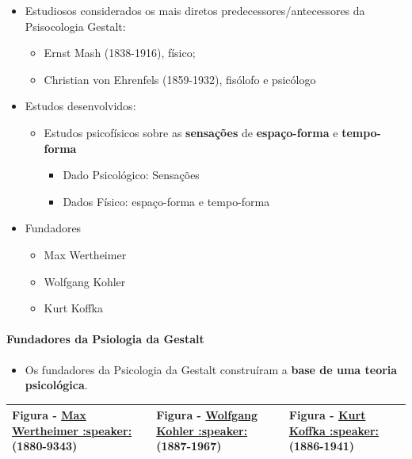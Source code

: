 \documentclass[
]{book}
\providecommand{\tightlist}{%
  \setlength{\itemsep}{0pt}\setlength{\parskip}{0pt}}
\begin{document}
\begin{itemize}
\tightlist
\item
  Estudiosos considerados os mais diretos predecessores/antecessores da Psisocologia Gestalt:

  \begin{itemize}
  \tightlist
  \item
    Ernst Mash (1838-1916), físico;
  \item
    Christian von Ehrenfels (1859-1932), fisólofo e psicólogo
  \end{itemize}
\item
  Estudos desenvolvidos:

  \begin{itemize}
  \tightlist
  \item
    Estudos psicofísicos sobre as \textbf{sensações} de \textbf{espaço-forma} e \textbf{tempo-forma}

    \begin{itemize}
    \tightlist
    \item
      Dado Psicológico: Sensações
    \item
      Dados Físico: espaço-forma e tempo-forma
    \end{itemize}
  \end{itemize}
\item
  Fundadores

  \begin{itemize}
  \tightlist
  \item
    Max Wertheimer
  \item
    Wolfgang Kohler
  \item
    Kurt Koffka
  \end{itemize}
\end{itemize}

\hypertarget{fundadores-da-psiologia-da-gestalt}{%
\paragraph{Fundadores da Psiologia da Gestalt}\label{fundadores-da-psiologia-da-gestalt}}

\begin{itemize}
\tightlist
\item
  Os fundadores da Psicologia da Gestalt construíram a \textbf{base de uma teoria psicológica}.
\end{itemize}

\begin{longtable}[]{@{}
  >{\centering\arraybackslash}p{}
  >{\centering\arraybackslash}p{}
  >{\centering\arraybackslash}p{}@{}}
\toprule()
\endhead
Figura - \href{https://translate.google.com/?sl=hu\&tl=pt\&text=Max\%20Wertheimer\&op=translate}{Max Wertheimer :speaker:} (1880-9343) & Figura - \href{https://translate.google.com/?sl=de\&tl=pt\&text=Wolfgang\%20Kohler\&op=translate}{Wolfgang Kohler :speaker:}(1887-1967) & Figura - \href{https://translate.google.com/?sl=de\&tl=pt\&text=Kurt\%20Koffka\&op=translate}{Kurt Koffka :speaker:}(1886-1941) \\
\bottomrule()
\end{longtable}
\end{document}
